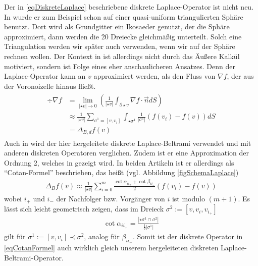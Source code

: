     \begin{bemerkung}
      Der in \eqref{eqDiskreteLaplace} beschriebene diskrete Laplace-Operator ist nicht neu.
      In \cite{arakawa} wurde er zum Beispiel schon auf einer quasi-uniform 
      triangulierten Sphäre benutzt. 
      Dort wird als Grundgitter ein Ikosaeder genutzt, der die Sphäre approximiert,
      dann werden die 20 Dreiecke gleichmäßig unterteilt.
      Solch eine Triangulation werden wir später auch verwenden, wenn wir auf der Sphäre rechnen wollen.
      Der Kontext in \cite{arakawa} ist allerdings nicht durch das Äußere Kalkül motiviert, sondern ist Folge eines eher anschaulicheren Ansatzes.
      Denn der Laplace-Operator kann an \( v \) approximiert werden, als den Fluss von \( \nabla f \), der aus der Voronoizelle hinaus fließt.
      \begin{align}
      \begin{aligned}
        \div\nabla f&= \lim_{\left| \star v \right| \rightarrow 0}
                                 \left( \frac{1}{\left| \star v \right|} \int_{\partial\star v}
                                              \nabla f \cdot \vec{n} dS\right) \\
                     &\approx \frac{1}{\left| \star v \right|} \sum_{\sigma^{1}=\left[ v,v_{i} \right]}
                                  \int_{\star\sigma^{1}} \frac{1}{\left| \sigma^{1} \right|} \left( f(v_{i}) - f(v) \right) dS \\
                     &= \Delta_{B,d} f(v)             
      \end{aligned}
      \end{align}
      Auch in \cite{meyer} wird der hier hergeleitete diskrete Laplace-Beltrami verwendet und mit anderen diskreten Operatoren verglichen.
      Zudem ist er eine Approximation der Ordnung 2, welches in \cite{xu} gezeigt wird.
      In beiden Artikeln ist er allerdings als "`Cotan-Formel"' beschrieben, das heißt (vgl. Abbildung \ref{figSchemaLaplace})
      \begin{align}
        \label{eqCotanFormel}
        \Delta_{B} f(v) \approx \frac{1}{\left| \star v \right|} \sum_{i=0}^{m} 
                      \frac{\cot\alpha_{ii_{+}} + \cot\beta_{ii_{-}}}{2}
                            \left( f(v_{i}) - f(v) \right)
      \end{align}
      wobei \( i_{+} \) und \( i_{-} \) der Nachfolger bzw. Vorgänger von \( i \) ist modulo \( (m+1) \).
      Es lässt sich leicht geometrisch zeigen, dass im Dreieck \( \sigma^{2}:=\left[ v, v_{i}, v_{i_{+}} \right] \) 
      \begin{align}
        \cot\alpha_{ii_{+}} = \frac{\left| \star\sigma^{1} \cap \sigma^{2} \right|}{\frac{1}{2}\left| \sigma^{1} \right|}
      \end{align}
      gilt für \( \sigma^{1}:=\left[ v, v_{i} \right] \prec \sigma^{2}\),
      analog für \( \beta_{ii_{-}} \).
      Somit ist der diskrete Operator in \eqref{eqCotanFormel} auch wirklich gleich unserem hergeleiteten diskreten Laplace-Beltrami-Operator.


\end{bemerkung}
